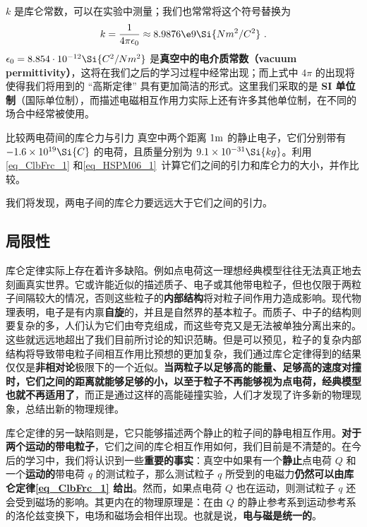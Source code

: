 $k$ 是库仑常数，可以在实验中测量；我们也常常将这个符号替换为
\begin{equation}
k = \frac{1}{4\pi\epsilon_0} \approx 8.9876\e9 \Si{N m^2/C^2}~.
\end{equation}
$\epsilon_0=8.854\cdot 10^{-12} \Si{C^2/Nm^2}$ 是\textbf{真空中的电介质常数（vacuum permittivity）}，这将在我们之后的学习过程中经常出现；而上式中 $4\pi$ 的出现将使得我们将用到的 “高斯定律” 具有更加简洁的形式。这里我们采取的是\textbf{ SI 单位制}（国际单位制），而描述电磁相互作用力实际上还有许多其他单位制，在不同的场合中经常被使用。

\begin{exercise}{比较两电荷间的库仑力与引力}
真空中两个距离 $1 \rm m$ 的静止电子，它们分别带有 $-1.6\times 10^{19} \Si{C}$ 的电荷，且质量分别为 $9.1\times 10^{-31} \Si{kg}$。利用\autoref{eq_ClbFrc_1} 和\autoref{eq_HSPM06_1}~计算它们之间的引力和库仑力的大小，并作比较。
\end{exercise}
我们将发现，两电子间的库仑力要远远大于它们之间的引力。
\subsection{局限性}
库仑定律实际上存在着许多缺陷。例如点电荷这一理想经典模型往往无法真正地去刻画真实世界。它或许能近似的描述质子、电子或其他带电粒子，但也仅限于两粒子间隔较大的情况，否则这些粒子的\textbf{内部结构}将对粒子间作用力造成影响。现代物理表明，电子是有内禀\textbf{自旋}的，并且是自然界的基本粒子。而质子、中子的结构则要复杂的多，人们认为它们由夸克组成，而这些夸克又是无法被单独分离出来的。这些就远远地超出了我们目前所讨论的知识范畴。但是可以预见，粒子的复杂内部结构将导致带电粒子间相互作用比预想的更加复杂，我们通过库仑定律得到的结果仅仅是\textbf{非相对论}极限下的一个近似。\textbf{当两粒子以足够高的能量、足够高的速度对撞时，它们之间的距离就能够足够的小，以至于粒子不再能够视为点电荷，经典模型也就不再适用了}，而正是通过这样的高能碰撞实验，人们才发现了许多新的物理现象，总结出新的物理规律。

库仑定律的另一缺陷则是，它只能够描述两个静止的粒子间的静电相互作用。\textbf{对于两个运动的带电粒子}，它们之间的库仑相互作用如何，我们目前是不清楚的。在今后的学习中，我们将认识到一些\textbf{重要的事实}：真空中如果有一个\textbf{静止}点电荷 $Q$ 和一个\textbf{运动的}带电荷 $q$ 的测试粒子，那么测试粒子 $q$ 所受到的电磁力\textbf{仍然可以由库仑定律\autoref{eq_ClbFrc_1} 给出}。然而，如果点电荷 $Q$ 也在运动，则测试粒子 $q$ 还会受到磁场的影响。其更内在的物理原理是：在由 $Q$ 的静止参考系到运动参考系的洛伦兹变换下，电场和磁场会相伴出现。也就是说，\textbf{电与磁是统一的}。